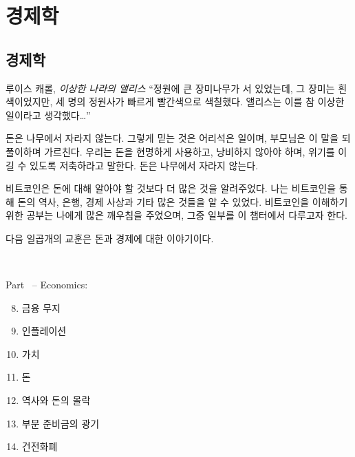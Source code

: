 \part{경제학}
\label{ch:economics}
\chapter*{경제학}

\begin{chapquote}{루이스 캐롤, \textit{이상한 나라의 앨리스}}
\enquote{정원에 큰 장미나무가 서 있었는데, 그 장미는 흰색이었지만, 세 명의 정원사가 빠르게 빨간색으로 색칠했다.
앨리스는 이를 참 이상한 일이라고 생각했다\ldots}
\end{chapquote}

돈은 나무에서 자라지 않는다. 
그렇게 믿는 것은 어리석은 일이며, 부모님은 이 말을 되풀이하며 가르친다.
우리는 돈을 현명하게 사용하고, 낭비하지 않아야 하며, 위기를 이길 수 있도록 저축하라고 말한다. 
돈은 나무에서 자라지 않는다.

비트코인은 돈에 대해 알아야 할 것보다 더 많은 것을 알려주었다. 
나는 비트코인을 통해 돈의 역사, 은행, 경제 사상과 기타 많은 것들을 알 수 있었다. 
비트코인을 이해하기 위한 공부는 나에게 많은 깨우침을 주었으며, 그중 일부를 이 챕터에서 다루고자 한다.

다음 일곱개의 교훈은 돈과 경제에 대한 이야기이다.

~

\begin{samepage}
Part~\ref{ch:economics} -- Economics:

\begin{enumerate}
  \setcounter{enumi}{7}
  \item 금융 무지
  \item 인플레이션
  \item 가치
  \item 돈
  \item 역사와 돈의 몰락
  \item 부분 준비금의 광기
  \item 건전화폐
\end{enumerate}
\end{samepage}

